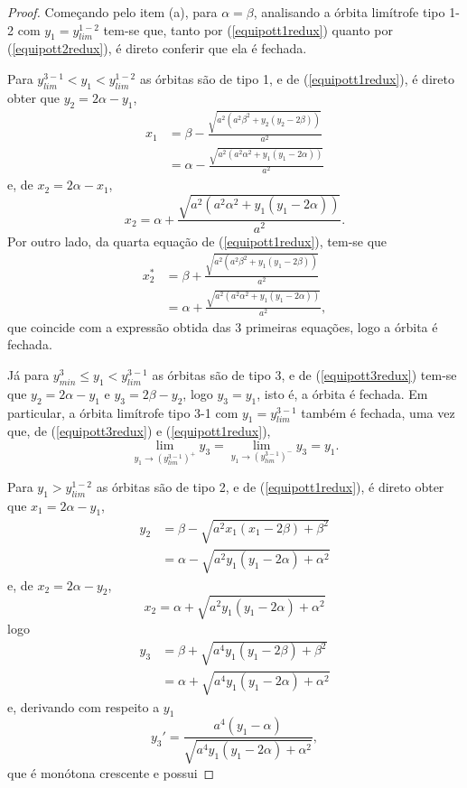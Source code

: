 \begin{proof}
Começando pelo item (a), para $\alpha=\beta$, analisando a órbita limítrofe tipo 1-2 com $y_1=y_{lim}^{1-2}$ tem-se que, tanto por (\ref{equipott1redux}) quanto por (\ref{equipott2redux}), é direto conferir que ela é fechada. 

Para $y_{lim}^{3-1}<y_1<y_{lim}^{1-2}$ as órbitas são de tipo 1, e de (\ref{equipott1redux}), é direto obter que $y_2=2\alpha-y_1$, 
\begin{align*}
x_1&=\beta-\frac{\sqrt{ a^2( a^2\beta^2 +  y_2 (y_2 - 2 \beta))}}{ a^2}\\&=\alpha-\frac{\sqrt{ a^2(a^2 \alpha^2 +  y_1 (y_1 - 2 \alpha))}}{ a^2}
\end{align*}
e, de $x_2=2\alpha-x_1$,  
$$
x_2=\alpha+\frac{\sqrt{ a^2(a^2 \alpha^2 +  y_1 (y_1 - 2 \alpha))}}{ a^2}.
$$
Por outro lado, da quarta equação de (\ref{equipott1redux}), tem-se que
\begin{align*}
x_2^*&=\beta+\frac{\sqrt{ a^2(a^2 \beta^2 +  y_1 (y_1 - 2 \beta))}}{ a^2}\\
&=\alpha+\frac{\sqrt{ a^2(a^2 \alpha^2 +  y_1 (y_1 - 2 \alpha))}}{ a^2},
\end{align*}
que coincide com a expressão obtida das 3 primeiras equações, logo a órbita é fechada. 

Já para $y_{min}^3\leq y_1<y_{lim}^{3-1}$ as órbitas são de tipo 3, e de (\ref{equipott3redux}) tem-se que $y_2=2\alpha-y_1$ e $y_3=2\beta-y_2$, logo $y_3=y_1$, isto é, a órbita é fechada. Em particular, a órbita limítrofe tipo 3-1 com $y_1=y_{lim}^{3-1}$ também é fechada, uma vez que, de (\ref{equipott3redux}) e (\ref{equipott1redux}),
$$
\lim_{y_1\to (y_{lim}^{3-1})^+}y_3=\lim_{y_1\to (y_{lim}^{3-1})^-}y_3=y_1.
$$

Para $y_1>y_{lim}^{1-2}$ as órbitas são de tipo 2, e de (\ref{equipott1redux}), é direto obter que $x_1=2\alpha-y_1$, 
\begin{align*}
y_2&=\beta-\sqrt{ a^2x_1 (x_1 - 2 \beta)+\beta^2}\\&=\alpha-\sqrt{ a^2y_1 (y_1 - 2 \alpha)+\alpha^2}
\end{align*}
e, de $x_2=2\alpha-y_2$,  
$$
x_2=\alpha+\sqrt{ a^2y_1 (y_1 - 2 \alpha)+\alpha^2}
$$
logo 
\begin{align*}
y_3&=\beta+\sqrt{ a^4y_1 (y_1 - 2 \beta)+\beta^2}
\\&=\alpha+\sqrt{ a^4y_1 (y_1 - 2 \alpha)+\alpha^2}
\end{align*}
e, derivando com respeito a $y_1$
$$y_3'=\frac{a^4(y_1-\alpha)}{\sqrt{ a^4y_1 (y_1 - 2 \alpha)+\alpha^2}},$$
que é monótona crescente e possui 


\end{proof}
